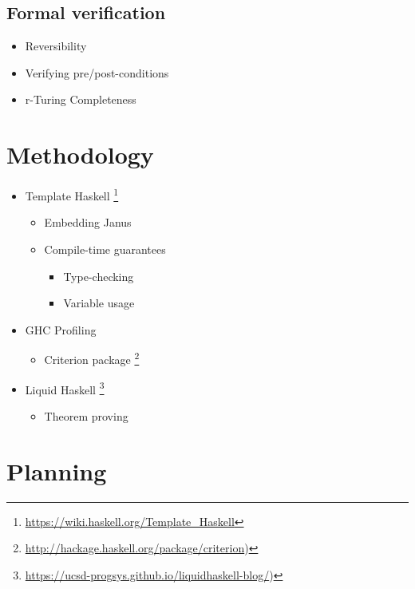 \documentclass[12pt,a4paper]{article}
\begin{document}
	\subsection{Formal verification}
	\begin{itemize}
		\item{Reversibility}
		\item{Verifying pre/post-conditions}
		\item{r-Turing Completeness}
	\end{itemize}

\section{Methodology}
\begin{itemize}
	\item{Template Haskell \footnote{\url{https://wiki.haskell.org/Template_Haskell}}}
	\begin{itemize}
		\item{Embedding Janus}
		\item{Compile-time guarantees}
		\begin{itemize}
			\item{Type-checking}
			\item{Variable usage}
		\end{itemize}
		
	\end{itemize}
	
	\item{GHC Profiling}
	\begin{itemize}
		\item{Criterion package \footnote{\url{http://hackage.haskell.org/package/criterion})}}
	\end{itemize}
	
	\item{Liquid Haskell \footnote{\url{https://ucsd-progsys.github.io/liquidhaskell-blog/})}}
	\begin{itemize}
		\item{Theorem proving}
	\end{itemize}
\end{itemize}

\section{Planning}
\end{document}
